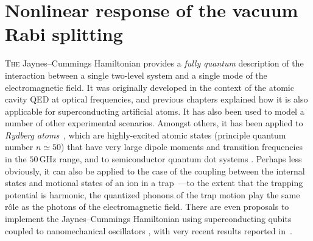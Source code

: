 %
\chapter{%
    \texorpdfstring{Nonlinear response of the vacuum Rabi splitting}%
                        {Nonlinear vacuum Rabi}}\label{ch:vrabi}%
%
\lettrine{T}{he} Jaynes--Cummings Hamiltonian  provides a \emph{fully quantum} description of the interaction between a single two-level system and a single mode of the electromagnetic field. It was originally developed in the context of the atomic cavity QED at optical frequencies, and previous chapters explained how it is also applicable for superconducting artificial atoms. It has also been used to model a number of other experimental scenarios. Amongst others, it has been applied to \emph{Rydberg atoms}~\cite{haroche_raimond_exploring}, which are highly-excited atomic states (principle quantum number $n\simeq50$) that have very large dipole moments and transition frequencies in the $50\,\text{GHz}$ range, and to semiconductor quantum dot systems \cite{reithmaier_strong_2004, yoshie_vacuum_2004}. Perhaps less obviously, it can also be applied to the case of the coupling between the internal states and motional states of an ion in a trap~\cite{leibfried_quantum_2003, gabrielse_observation_1985}---to the extent that the trapping potential is harmonic, the quantized phonons of the trap motion play the same r\^ole as the photons of the electromagnetic field. There are even proposals to implement the Jaynes--Cummings Hamiltonian using superconducting qubits coupled  to nanomechanical oscillators \cite{irish_quantum_2003}, with very recent results reported in~\cite{oconnell_quantum_2010}.


